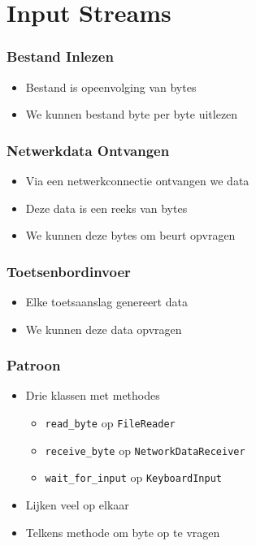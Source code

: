 \section{Input Streams}

\frame{\tableofcontents[currentsection]}

\begin{frame}
  \frametitle{Bestand Inlezen}
  \begin{itemize}
    \item Bestand is opeenvolging van bytes
    \item We kunnen bestand byte per byte uitlezen
  \end{itemize}
\end{frame}

\begin{frame}
  \frametitle{Netwerkdata Ontvangen}
  \begin{itemize}
    \item Via een netwerkconnectie ontvangen we data
    \item Deze data is een reeks van bytes
    \item We kunnen deze bytes om beurt opvragen
  \end{itemize}
\end{frame}

\begin{frame}
  \frametitle{Toetsenbordinvoer}
  \begin{itemize}
    \item Elke toetsaanslag genereert data
    \item We kunnen deze data opvragen
  \end{itemize}
\end{frame}

\begin{frame}
  \frametitle{Patroon}
  \begin{itemize}
    \item Drie klassen met methodes
          \begin{itemize}
            \item \texttt{read\_byte} op \texttt{FileReader}
            \item \texttt{receive\_byte} op \texttt{NetworkDataReceiver}
            \item \texttt{wait\_for\_input} op \texttt{KeyboardInput}
          \end{itemize}
    \item Lijken veel op elkaar
    \item Telkens methode om byte op te vragen
  \end{itemize}
\end{frame}

